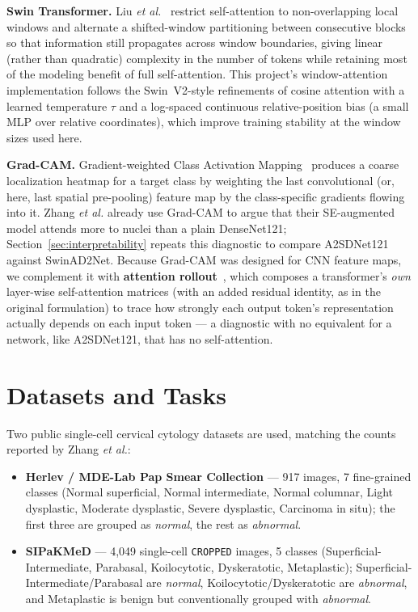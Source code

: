 \documentclass[10pt,twocolumn]{article}
\newcommand{\code}[1]{\texttt{\small #1}}
\begin{document}
\textbf{Swin Transformer.} Liu \emph{et al.}~\cite{liu2021swin} restrict self-attention to non-overlapping local windows and alternate a shifted-window partitioning between consecutive blocks so that information still propagates across window boundaries, giving linear (rather than quadratic) complexity in the number of tokens while retaining most of the modeling benefit of full self-attention. This project's window-attention implementation follows the Swin~V2-style refinements of cosine attention with a learned temperature $\tau$ and a log-spaced continuous relative-position bias (a small MLP over relative coordinates), which improve training stability at the window sizes used here.

\textbf{Grad-CAM.} Gradient-weighted Class Activation Mapping~\cite{selvaraju2017} produces a coarse localization heatmap for a target class by weighting the last convolutional (or, here, last spatial pre-pooling) feature map by the class-specific gradients flowing into it. Zhang \emph{et al.} already use Grad-CAM to argue that their SE-augmented model attends more to nuclei than a plain DenseNet121; Section~\ref{sec:interpretability} repeats this diagnostic to compare A2SDNet121 against SwinAD2Net. Because Grad-CAM was designed for CNN feature maps, we complement it with \textbf{attention rollout}~\cite{abnar2020}, which composes a transformer's \emph{own} layer-wise self-attention matrices (with an added residual identity, as in the original formulation) to trace how strongly each output token's representation actually depends on each input token --- a diagnostic with no equivalent for a network, like A2SDNet121, that has no self-attention.

\section{Datasets and Tasks}

Two public single-cell cervical cytology datasets are used, matching the counts reported by Zhang \emph{et al.}:

\begin{itemize}[leftmargin=*,itemsep=1pt,topsep=2pt]
    \item \textbf{Herlev / MDE-Lab Pap Smear Collection} --- 917 images, 7 fine-grained classes (Normal superficial, Normal intermediate, Normal columnar, Light dysplastic, Moderate dysplastic, Severe dysplastic, Carcinoma in situ); the first three are grouped as \emph{normal}, the rest as \emph{abnormal}.
    \item \textbf{SIPaKMeD} --- 4{,}049 single-cell \code{CROPPED} images, 5 classes (Superficial-Intermediate, Parabasal, Koilocytotic, Dyskeratotic, Metaplastic); Superficial-Intermediate/Parabasal are \emph{normal}, Koilocytotic/Dyskeratotic are \emph{abnormal}, and Metaplastic is benign but conventionally grouped with \emph{abnormal}.
\end{itemize}
\end{document}
